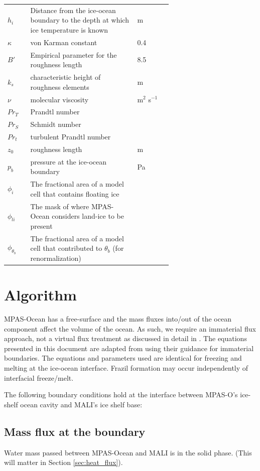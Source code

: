 \documentclass[11pt]{report}
\begin{document}
\begin{tabularx}{\linewidth}{l|p{0.65\linewidth}|X}
    $h_i$ & Distance from the ice-ocean boundary to the depth at which ice temperature is known & m \\
    $\kappa$ & von Karman constant & 0.4 \\
    $B'$ & Empirical parameter for the roughness length & 8.5 \\
    $k_s$ & characteristic height of roughness elements & m\\
    $\nu$ & molecular viscosity & m$^2$ s$^{-1}$\\
    $Pr_T$ & Prandtl number & \\
    $Pr_S$ & Schmidt number & \\
    $Pr_t$ & turbulent Prandtl number & \\
    $z_0$ & roughness length & m\\
    $p_b$ & pressure at the ice-ocean boundary & Pa \\
    $\phi_i$ & The fractional area of a model cell that contains floating ice & \\
    $\phi_{li}$ & The mask of where MPAS-Ocean considers land-ice to be present & \\
    $\phi_{\theta_b}$ & The fractional area of a model cell that contributed to $\theta_b$ (for renormalization) &
\end{tabularx}

\section{Algorithm}

MPAS-Ocean has a free-surface and the mass fluxes into/out of the ocean component affect the volume of the ocean. As such, we require an immaterial flux approach, not a virtual flux treatment as discussed in detail in \cite{jenkins_role_2001}. The equations presented in this document are adapted from \cite{burchard_vertical_2022} using their guidance for immaterial boundaries. The equations and parameters used are identical for freezing and melting at the ice-ocean interface. Frazil formation may occur independently of interfacial freeze/melt.

The following boundary conditions hold at the interface between MPAS-O's ice-shelf ocean cavity and MALI's ice shelf base:

\subsection{Mass flux at the boundary}

Water mass passed between MPAS-Ocean and MALI is in the solid phase. (This will matter in Section \ref{sec:heat_flux}).
\end{document}
